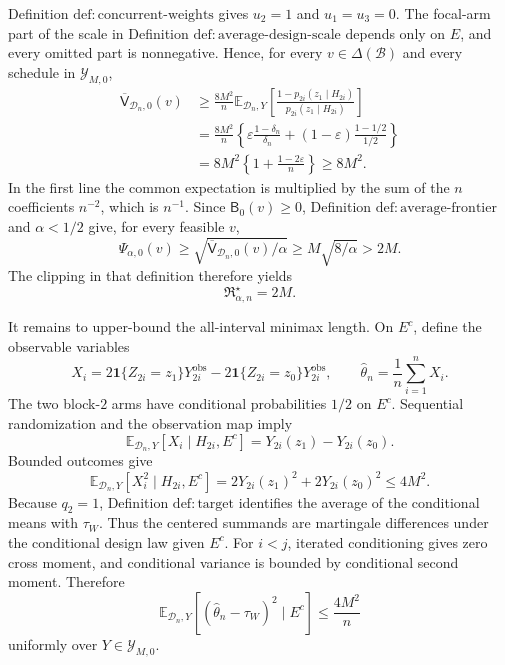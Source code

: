 Definition \(\mathrm{def:concurrent\text{-}weights}\) gives \(u_2=1\) and \(u_1=u_3=0\).  The focal-arm part of the scale in Definition \(\mathrm{def:average\text{-}design\text{-}scale}\) depends only on \(E\), and every omitted part is nonnegative.  Hence, for every \(v\in\Delta(\mathcal B)\) and every schedule in \(\mathcal Y_{M,0}\),
\[
\begin{aligned}
 \overline{\mathsf V}_{\mathcal D_n,0}(v)
 &\ge
 \frac{8M^2}{n}
 \mathbb E_{\mathcal D_n,Y}
 \left[
  \frac{1-p_{2i}(z_1\mid H_{2i})}
       {p_{2i}(z_1\mid H_{2i})}
 \right]\\
 &=\frac{8M^2}{n}
 \left\{
  \varepsilon\frac{1-\delta_n}{\delta_n}
  +(1-\varepsilon)\frac{1-1/2}{1/2}
 \right\}\\
 &=8M^2\left\{1+\frac{1-2\varepsilon}{n}\right\}
 \ge8M^2.
\end{aligned}
\]
In the first line the common expectation is multiplied by the sum of the \(n\) coefficients \(n^{-2}\), which is \(n^{-1}\).  Since \(\mathsf B_0(v)\ge0\), Definition \(\mathrm{def:average\text{-}frontier}\) and \(\alpha<1/2\) give, for every feasible \(v\),
\[
 \Psi_{\alpha,0}(v)
 \ge\sqrt{\overline{\mathsf V}_{\mathcal D_n,0}(v)/\alpha}
 \ge M\sqrt{8/\alpha}>2M.
\]
The clipping in that definition therefore yields
\[
 \mathfrak R_{\alpha,n}^\star=2M.
\]

It remains to upper-bound the all-interval minimax length.  On \(E^c\), define the observable variables
\[
 X_i=2\mathbf 1\{Z_{2i}=z_1\}Y^{\mathrm{obs}}_{2i}
     -2\mathbf 1\{Z_{2i}=z_0\}Y^{\mathrm{obs}}_{2i},
 \qquad
 \widehat\theta_n=\frac1n\sum_{i=1}^n X_i.
\]
The two block-\(2\) arms have conditional probabilities \(1/2\) on \(E^c\).  Sequential randomization and the observation map imply
\[
 \mathbb E_{\mathcal D_n,Y}[X_i\mid H_{2i},E^c]
 =Y_{2i}(z_1)-Y_{2i}(z_0).
\]
Bounded outcomes give
\[
 \mathbb E_{\mathcal D_n,Y}[X_i^2\mid H_{2i},E^c]
 =2Y_{2i}(z_1)^2+2Y_{2i}(z_0)^2
 \le4M^2.
\]
Because \(q_2=1\), Definition \(\mathrm{def:target}\) identifies the average of the conditional means with \(\tau_W\).  Thus the centered summands are martingale differences under the conditional design law given \(E^c\).  For \(i<j\), iterated conditioning gives zero cross moment, and conditional variance is bounded by conditional second moment.  Therefore
\[
 \mathbb E_{\mathcal D_n,Y}
 \left[(\widehat\theta_n-\tau_W)^2\mid E^c\right]
 \le\frac{4M^2}{n}
\]
uniformly over \(Y\in\mathcal Y_{M,0}\).

